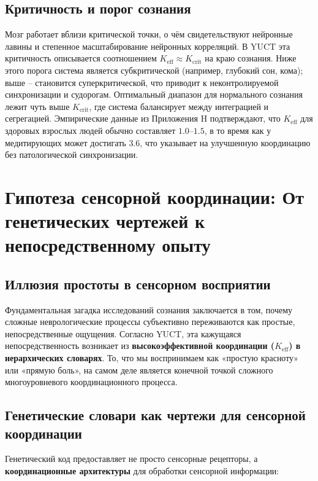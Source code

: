 \documentclass[12pt,a4paper]{article}
\newcommand{\eff}{\mathrm{eff}}
\newcommand{\Ke}{K_{\eff}}
\newcommand{\Kcrit}{K_{\mathrm{crit}}}
\begin{document}
	\subsection{Критичность и порог сознания}
	
	Мозг работает вблизи критической точки, о чём свидетельствуют нейронные лавины и степенное масштабирование нейронных корреляций. В YUCT эта критичность описывается соотношением $\Ke \approx \Kcrit$ на краю сознания. Ниже этого порога система является субкритической (например, глубокий сон, кома); выше – становится суперкритической, что приводит к неконтролируемой синхронизации и судорогам. Оптимальный диапазон для нормального сознания лежит чуть выше $\Kcrit$, где система балансирует между интеграцией и сегрегацией. Эмпирические данные из Приложения H подтверждают, что $\Ke$ для здоровых взрослых людей обычно составляет $1.0$–$1.5$, в то время как у медитирующих может достигать $3.6$, что указывает на улучшенную координацию без патологической синхронизации.
	
	\section{Гипотеза сенсорной координации: От генетических чертежей к непосредственному опыту}
	
	\subsection{Иллюзия простоты в сенсорном восприятии}
	
	Фундаментальная загадка исследований сознания заключается в том, почему сложные неврологические процессы субъективно переживаются как простые, непосредственные ощущения. Согласно YUCT, эта кажущаяся непосредственность возникает из \textbf{высокоэффективной координации ($\Ke$) в иерархических словарях}. То, что мы воспринимаем как «простую красноту» или «прямую боль», на самом деле является конечной точкой сложного многоуровневого координационного процесса.
	
	\subsection{Генетические словари как чертежи для сенсорной координации}
	
	Генетический код предоставляет не просто сенсорные рецепторы, а \textbf{координационные архитектуры} для обработки сенсорной информации:
	
\end{document}
